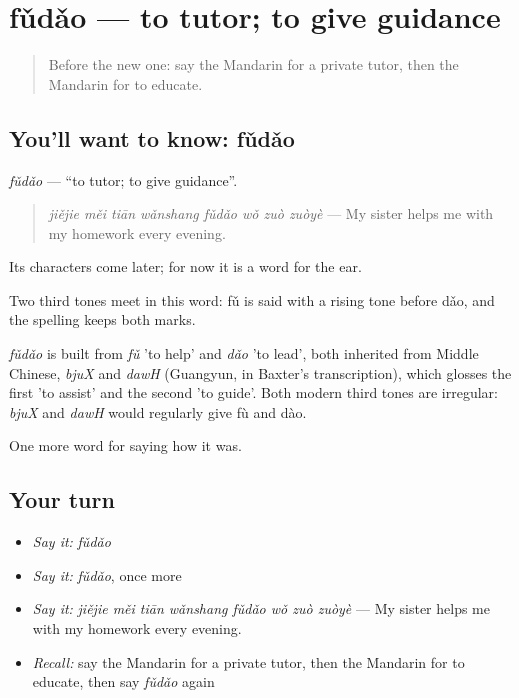 \section[fǔdǎo]{fǔdǎo — to tutor; to give guidance}

\label{lesson:ZH-C493-fudao}



\begin{quote}
Before the new one: say the Mandarin for a private tutor, then the Mandarin for to educate.
\end{quote}

\subsection*{You'll want to know: fǔdǎo}
\emph{fǔdǎo} — \textquotedblleft{}to tutor; to give guidance\textquotedblright{}.

\begin{quote}
\emph{jiějie měi tiān wǎnshang fǔdǎo wǒ zuò zuòyè} — My sister helps me with my homework every evening.
\end{quote}

Its characters come later; for now it is a word for the ear.

Two third tones meet in this word: fǔ is said with a rising tone before dǎo, and the spelling keeps both marks.

\begin{cousinweb}
\emph{fǔdǎo} is built from \emph{fǔ} 'to help' and \emph{dǎo} 'to lead', both inherited from Middle Chinese, \emph{bjuX} and \emph{dawH} (Guangyun, in Baxter's transcription), which glosses the first 'to assist' and the second 'to guide'. Both modern third tones are irregular: \emph{bjuX} and \emph{dawH} would regularly give fù and dào.
\end{cousinweb}

\begin{grammarlens}[title={What you've built}]
One more word for saying how it was.
\end{grammarlens}

\subsection*{Your turn}
\begin{itemize}
\raggedright
  \item \emph{Say it:} \emph{fǔdǎo}
  \item \emph{Say it:} \emph{fǔdǎo}, once more
  \item \emph{Say it:} \emph{jiějie měi tiān wǎnshang fǔdǎo wǒ zuò zuòyè} — My sister helps me with my homework every evening.
  \item \emph{Recall:} say the Mandarin for a private tutor, then the Mandarin for to educate, then say \emph{fǔdǎo} again
\end{itemize}

